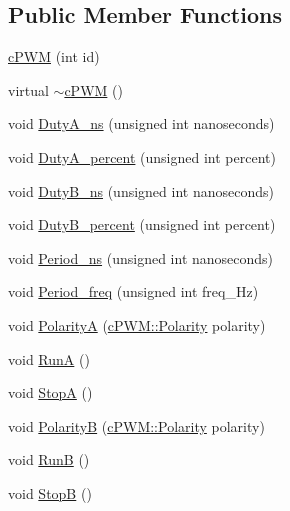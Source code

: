 \subsection*{\-Public \-Member \-Functions}
\begin{DoxyCompactItemize}
\item 
\hyperlink{classc_p_w_m_1_1c_p_w_m_a87ddc70eca104f023cf4e1fab0b790ed}{c\-P\-W\-M} (int id)
\item 
virtual \hyperlink{classc_p_w_m_1_1c_p_w_m_a97435529da4f7c42d75165d12836ba33}{$\sim$c\-P\-W\-M} ()
\item 
void \hyperlink{classc_p_w_m_1_1c_p_w_m_aec5fb0cd9369c28dc24522b588c81a12}{\-Duty\-A\-\_\-ns} (unsigned int nanoseconds)
\item 
void \hyperlink{classc_p_w_m_1_1c_p_w_m_afefcfe004ca8879482391586cdec259f}{\-Duty\-A\-\_\-percent} (unsigned int percent)
\item 
void \hyperlink{classc_p_w_m_1_1c_p_w_m_a8129f4ef44dbeaae6505c2f66a82f0f0}{\-Duty\-B\-\_\-ns} (unsigned int nanoseconds)
\item 
void \hyperlink{classc_p_w_m_1_1c_p_w_m_a072d3743030283a61f4b383a556eafac}{\-Duty\-B\-\_\-percent} (unsigned int percent)
\item 
void \hyperlink{classc_p_w_m_1_1c_p_w_m_a65985891447da0e318fc95a3bea887bf}{\-Period\-\_\-ns} (unsigned int nanoseconds)
\item 
void \hyperlink{classc_p_w_m_1_1c_p_w_m_a294d333e40010689874fd3d54938a034}{\-Period\-\_\-freq} (unsigned int freq\-\_\-\-Hz)
\item 
void \hyperlink{classc_p_w_m_1_1c_p_w_m_a1ea0d09a5a5614c6ce06ca496f24f8b7}{\-Polarity\-A} (\hyperlink{classc_p_w_m_1_1c_p_w_m_af190eac685b62a4a27e3b9b6fc3aba09}{c\-P\-W\-M\-::\-Polarity} polarity)
\item 
void \hyperlink{classc_p_w_m_1_1c_p_w_m_ab97deebd2a12697c033d2f0cfad01ffe}{\-Run\-A} ()
\item 
void \hyperlink{classc_p_w_m_1_1c_p_w_m_a4c25685907cdfb7901f735962abce75e}{\-Stop\-A} ()
\item 
void \hyperlink{classc_p_w_m_1_1c_p_w_m_a20aa0037edcae7f2fffecca3ab9eccfd}{\-Polarity\-B} (\hyperlink{classc_p_w_m_1_1c_p_w_m_af190eac685b62a4a27e3b9b6fc3aba09}{c\-P\-W\-M\-::\-Polarity} polarity)
\item 
void \hyperlink{classc_p_w_m_1_1c_p_w_m_aa6dc5671e0c6cf8048c1bccf859b5b66}{\-Run\-B} ()
\item 
void \hyperlink{classc_p_w_m_1_1c_p_w_m_af266ed026306c6a3138d47fce8dec541}{\-Stop\-B} ()
\end{DoxyCompactItemize}


